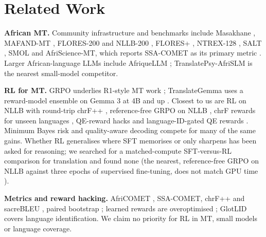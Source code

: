\section{Related Work}\label{sec:related}
\textbf{African MT.} Community infrastructure and benchmarks include Masakhane \citep{nekoto2020participatory}, MAFAND-MT \citep{adelani2022mafand}, FLORES-200 and NLLB-200 \citep{goyal2022flores101,nllb2022nllb}, FLORES+ \citep{oldi2025floresplus}, NTREX-128 \citep{federmann2022ntrex}, SALT \citep{akera2022salt}, SMOL \citep{caswell2025smol} and AfriScience-MT, which reports SSA-COMET \citep{li2025ssacomet} as its primary metric \citep{abdulmumin2026afriscience}. Larger African-language LLMs include AfriqueLLM \citep{yu2026afriquellm}; TranslatePsy-AfriSLM \citep{gritta2026translatepsy} is the nearest small-model competitor.

\textbf{RL for MT.} GRPO \citep{shao2024deepseekmath,yu2025dapo} underlies R1-style MT work \citep{feng2025mtr1zero,wang2025deeptrans,cheng2025seedx,zheng2025hunyuanmt}; TranslateGemma uses a reward-model ensemble on Gemma 3 at 4B and up \citep{finkelstein2026translategemma}. Closest to us are RL on NLLB with round-trip chrF++ \citep{attia2026roundtrip}, reference-free GRPO on NLLB \citep{garciaestrada2026reffree}, chrF rewards for unseen languages \citep{hu2026rlunseen}, QE-reward hacks \citep{liu2026walar} and language-ID-gated QE rewards \citep{han2026milmmtrl}. Minimum Bayes risk and quality-aware decoding \citep{freitag2022mbr,fernandes2022qualityaware} compete for many of the same gains. Whether RL generalises where SFT memorises \citep{chu2025sft} or only sharpens \citep{yue2025doesrl} has been asked for reasoning; we searched for a matched-compute SFT-versus-RL comparison for translation and found none (the nearest, reference-free GRPO on NLLB against three epochs of supervised fine-tuning, does not match GPU time \citep{garciaestrada2026reffree}).

\textbf{Metrics and reward hacking.} AfriCOMET \citep{wang2024africomet}, SSA-COMET, chrF++ and sacreBLEU \citep{popovic2017chrfpp,post2018call}, paired bootstrap \citep{koehn2004significance}; learned rewards are overoptimised \citep{gao2023scaling,coste2024ensembles}; GlotLID \citep{kargaran2023glotlid} covers language identification. We claim no priority for RL in MT, small models or language coverage.
